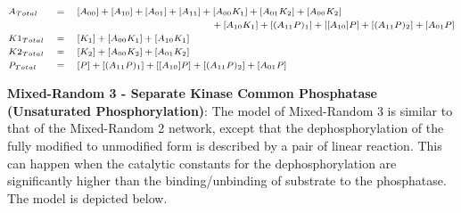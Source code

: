\documentclass[9pt,lineno]{elife}
\begin{document}
\begin{appendixbox}
\begin{equation}
\scriptsize{    \begin{alignedat}{3}
        & A_{Total} \quad &&= \quad [A_{00}]+[A_{10}]+[A_{01}]+[A_{11}]+[A_{00}K_{1}]+[A_{01}K_{2}]+[A_{00}K_{2}] && \\
        & && \hspace{45mm} +[A_{10}K_{1}]+[(A_{11}P)_1]+[[A_{10}]P]+[(A_{11}P)_2]+[A_{01}P] && \\
        & K1_{Total} \quad &&= \quad [K_1]+[A_{00}K_{1}]+[A_{10}K_{1}] && \\
        & K2_{Total} \quad &&= \quad [K_2]+[A_{00}K_{2}]+[A_{01}K_{2}] && \\
        & P_{Total} \quad &&= \quad [P]+[(A_{11}P)_1]+[[A_{10}]P]+[(A_{11}P)_2]+[A_{01}P] && \\
    \end{alignedat}}
\end{equation}

\textbf{Mixed-Random 3 - Separate Kinase Common Phosphatase (Unsaturated Phosphorylation)}:  The model of Mixed-Random 3 is similar  to that  of the Mixed-Random 2 network, except that the dephosphorylation of the fully modified to unmodified form is described by a pair of linear reaction. This can happen when the catalytic constants for the dephosphorylation are significantly higher than the binding/unbinding of substrate to the phosphatase.
The model is depicted below.



\end{appendixbox}
\end{document}
